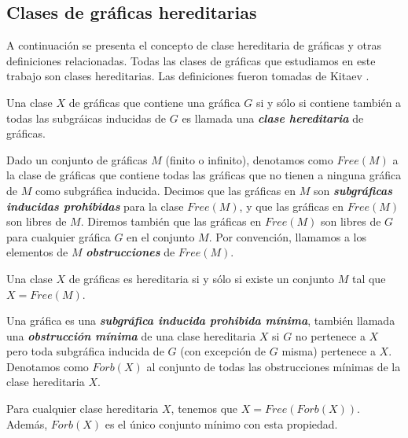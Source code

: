 \subsection{Clases de gráficas hereditarias}

A continuación se presenta el concepto de clase hereditaria de gráficas y otras definiciones relacionadas. Todas las clases de gráficas que estudiamos en este trabajo son clases hereditarias.  Las definiciones fueron tomadas de Kitaev \cite{Kitaev}.

Una clase $X$ de gráficas que contiene una gráfica $G$ si y sólo si contiene también a todas las subgráicas inducidas de $G$ es llamada una \textbf{\emph{clase hereditaria}} de gráficas.

Dado un conjunto de gráficas $M$ (finito o infinito), denotamos como $Free(M)$ a la clase de gráficas que contiene todas las gráficas que no tienen a ninguna gráfica de $M$ como subgráfica inducida. Decimos que las gráficas en $M$ son \textbf{\emph{subgráficas inducidas prohibidas}} para la clase $Free(M)$, y que las gráficas en $Free(M)$ son libres de $M$. Diremos también que las gráficas en $Free(M)$ son libres de $G$ para cualquier gráfica $G$ en el conjunto $M$. Por convención, llamamos a los elementos de $M$ \textbf{\emph{obstrucciones}} de $Free(M)$.

Una clase $X$ de gráficas es hereditaria si y sólo si existe un conjunto $M$ tal que $X = Free(M)$.

Una gráfica es una \textbf{\emph{subgráfica inducida  prohibida mínima}}, también llamada una \textbf{\emph{obstrucción mínima}} de una clase hereditaria $X$ si $G$ no pertenece a $X$ pero toda subgráfica inducida de $G$ (con excepción de $G$ misma) pertenece a $X$. Denotamos como $Forb(X)$ al conjunto de todas las obstrucciones mínimas de la clase hereditaria $X$.

Para cualquier clase hereditaria $X$, tenemos que $X = Free(Forb(X))$. Además, $Forb(X)$ es el único conjunto mínimo con esta propiedad.
